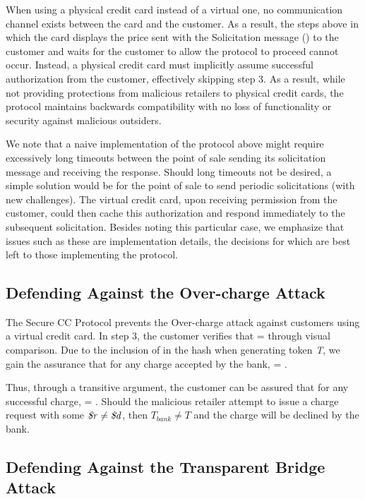 When using a physical credit card instead of a virtual one, no communication channel exists between the card and the customer.
As a result, the steps above in which the card displays the price sent with the Solicitation message () to the customer and waits for the customer to allow the protocol to proceed cannot occur.
Instead, a physical credit card must implicitly assume successful authorization from the customer, effectively skipping step 3.
As a result, while not providing protections from malicious retailers to physical credit cards, the protocol maintains backwards compatibility with no loss of functionality or security against malicious outsiders.

We note that a naive implementation of the protocol above might require excessively long timeouts between the point of sale sending its solicitation message and receiving the response.
Should long timeouts not be desired, a simple solution would be for the point of sale to send periodic solicitations (with new challenges).
The virtual credit card, upon receiving permission from the customer, could then cache this authorization and respond immediately to the subsequent solicitation.
Besides noting this particular case, we emphasize that issues such as these are implementation details, the decisions for which are best left to those implementing the protocol.

\subsection{Defending Against the Over-charge Attack}

The Secure CC Protocol prevents the Over-charge attack against customers using a virtual credit card.
In step 3, the customer verifies that \linebreak {} =  through visual comparison.
Due to the inclusion of  in the hash when generating token \emph{T}, we gain the assurance that for any charge accepted by the bank,  = .

Thus, through a transitive argument, the customer can be assured that for any successful charge,  = .
Should the malicious retailer attempt to issue a charge request with some $\textrm{\emph{\$r}} \neq \textrm{\emph{\$d}}$, then $T_{bank} \neq T$ and the charge will be declined by the bank.

\subsection{Defending Against the Transparent Bridge Attack}


